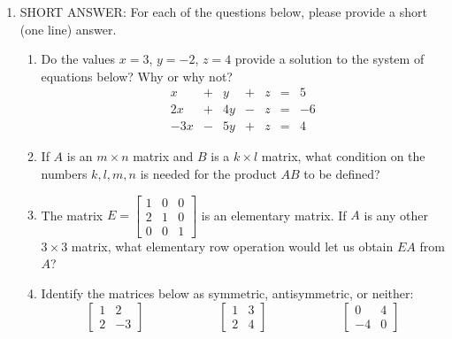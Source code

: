 \documentclass[12pt]{article}
\newcommand{\points}[1]{\marginpar{\hspace{24pt}[#1]}}
\begin{document}
\begin{enumerate}
\item SHORT ANSWER: For each of the questions below, please provide a short (one line) answer.
 \begin{enumerate}
\item Do the values $x=3$, $y=-2$, $z=4$ provide a solution to the system of equations below? Why or why not?\points{2}
\[
\begin{array}{ccccccc}
x&+&y&+&z&=&5\\
2x&+&4y&-&z&=&-6\\
-3x&-&5y&+&z&=&4
\end{array}
\]

\vspace{1in}

\item If $A$ is an $m\times n$ matrix and $B$ is a $k\times l$ matrix, what condition on the numbers $k,l,m,n$ is needed for the product $AB$ to be defined? \points{2}



\vspace{1in}

\item The matrix $E=\begin{bmatrix}
1&0&0\\2&1&0\\0&0&1
\end{bmatrix}$ is an elementary matrix. If $A$ is any other $3\times 3$ matrix, what elementary row operation would let us obtain $EA$ from $A$? \points{2}

\vspace{0.9in}



\item Identify the matrices below as symmetric, antisymmetric, or neither: \points{2}
\[
\begin{bmatrix}
1&2\\2&-3
\end{bmatrix}\hspace{1in} \begin{bmatrix}
1&3\\2&4
\end{bmatrix}\hspace{1in} \begin{bmatrix}
0&4\\-4&0
\end{bmatrix}
\]

\vspace{0.8in}


\end{enumerate}
\end{enumerate}
\end{document}
